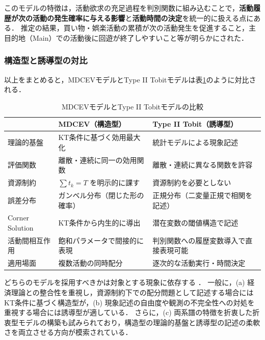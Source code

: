 このモデルの特徴は，活動欲求の充足過程を判別関数に組み込むことで，\textbf{活動履歴が次の活動の発生確率に与える影響}と\textbf{活動時間の決定}を統一的に扱える点にある．
推定の結果，買い物・娯楽活動の累積が次の活動発生を促進すること，主目的地（Main）での活動後に回遊が終了しやすいこと等が明らかにされた．

\subsubsection{構造型と誘導型の対比}

以上をまとめると，MDCEVモデルとType II Tobitモデルは表\ref{tab:mdcev_vs_tobit}のように対比される．

\begin{table}[htb]
\centering
\caption{MDCEVモデルとType II Tobitモデルの比較}
\label{tab:mdcev_vs_tobit}
\begin{tabular}{l p{5.5cm} p{5.5cm}}
\hline
 & \textbf{MDCEV}（構造型） & \textbf{Type II Tobit}（誘導型） \\
\hline
理論的基盤 & KT条件に基づく効用最大化 & 統計モデルによる現象記述 \\
評価関数 & 離散・連続に同一の効用関数 & 離散・連続に異なる関数を許容 \\
資源制約 & $\sum t_k = T$ を明示的に課す & 資源制約を必要としない \\
誤差分布 & ガンベル分布（閉じた形の確率） & 正規分布（二変量正規で相関を記述） \\
Corner Solution & KT条件から内生的に導出 & 潜在変数の閾値構造で記述 \\
活動間相互作用 & 飽和パラメータで間接的に表現 & 判別関数への履歴変数導入で直接表現可能 \\
適用場面 & 複数活動の同時配分 & 逐次的な活動実行・時間決定 \\
\hline
\end{tabular}
\end{table}

どちらのモデルを採用すべきかは対象とする現象に依存する \cite{FukudaChikaraishi2013}．
一般に，(a) 経済理論との整合性を重視し，資源制約下での配分問題として記述する場合にはKT条件に基づく構造型が，(b) 現象記述の自由度や観測の不完全性への対処を重視する場合には誘導型が適している．
さらに，(c) 両系譜の特徴を折衷した折衷型モデルの構築も試みられており，構造型の理論的基盤と誘導型の記述の柔軟さを両立させる方向が模索されている．
